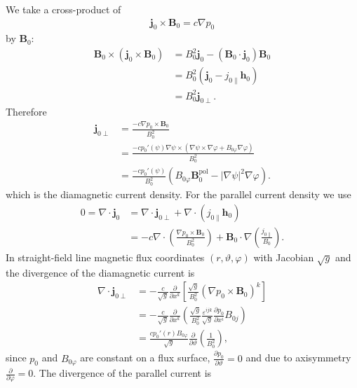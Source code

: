 \documentclass[a4paper, 10pt, english]{article}
\let\temp\vartheta
\let\vartheta\theta
\let\theta\temp
\let\temp\varphi
\let\varphi\phi
\let\phi\temp
\let\vec\symbf
\newcommand*\pd[2][]{\ensuremath{\frac{\partial #1}{\partial #2}}}
\newcommand*\pol{\ensuremath{\textrm{pol}}}
\begin{document}
We take a cross-product of
\begin{gather}
  \vec{j}_{0} \times \vec{B}_{0} = c \nabla p_{0}
\end{gather}
by $\vec{B}_{0}$:
\begin{align}
  \vec{B}_{0} \times \left( \vec{j}_{0} \times \vec{B}_{0} \right) &= B_{0}^{2} \vec{j}_{0} - (\vec{B}_{0} \cdot \vec{j}_{0}) \vec{B}_{0} \nonumber \\
  &= B_{0}^{2} (\vec{j}_{0} - j_{0 \parallel} \vec{h}_{0}) \nonumber \\
  &= B_{0}^{2} \vec{j}_{0 \perp}.
\end{align}
Therefore
\begin{align}
  \vec{j}_{0 \perp} &= \frac{-c \nabla p_{0} \times \vec{B}_{0}}{B_{0}^{2}} \\
  &= \frac{-c p_{0}' (\psi) \nabla \psi \times (\nabla \psi \times \nabla \phi + B_{0 \phi} \nabla \phi)}{B_{0}^{2}} \nonumber \\
  &= \frac{-c p_{0}' (\psi)}{B_{0}^{2}} \left( B_{0 \phi} \vec{B}_{0}^{\pol} - \lvert \nabla \psi \rvert^{2} \nabla \phi \right).
\end{align}
which is the diamagnetic current density. For the parallel current density we use
\begin{align}
 0 = \nabla \cdot \vec{j}_{0} &= \nabla \cdot \vec{j}_{0 \perp} + \nabla \cdot (j_{0 \parallel} \vec{h}_{0}) \nonumber \\
 &= -c \nabla \cdot \left( \frac{\nabla p_{0} \times \vec{B}_{0}}{B_{0}^{2}} \right) + \vec{B}_{0} \cdot \nabla \left( \frac{j_{0 \parallel}}{B_{0}} \right).
\end{align}
In straight-field line magnetic flux coordinates $(r, \theta, \phi)$ with Jacobian $\sqrt{g}$ and the divergence of the diamagnetic current is
\begin{align}
  \nabla \cdot \vec{j}_{0 \perp} &= -\frac{c}{\sqrt{g}} \pd{x^{k}} \left[ \frac{\sqrt{g}}{B_{0}^{2}} \left( \nabla p_{0} \times \vec{B}_{0} \right)^{k} \right] \nonumber \\
  &= -\frac{c}{\sqrt{g}} \pd{x^{k}} \left( \frac{\sqrt{g}}{B_{0}^{2}} \frac{\varepsilon^{ijk}}{\sqrt{g}} \pd[p_{0}]{x^{i}} B_{0 j} \right) \nonumber \\
  &= \frac{c p_{0}' (r) B_{0 \phi}}{\sqrt{g}} \pd{\theta} \left( \frac{1}{B_{0}^{2}} \right),
\end{align}
since $p_{0}$ and $B_{0 \phi}$ are constant on a flux surface, $\pd[p_{0}]{\theta} = 0$ and due to axisymmetry $\pd{\phi} = 0$. The divergence of the parallel current is
\end{document}
